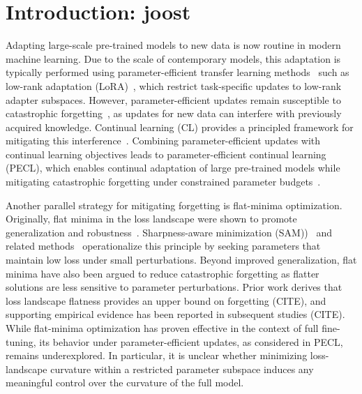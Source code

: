 \documentclass{article}
\theoremstyle{plain}
\theoremstyle{definition}
\theoremstyle{remark}
\begin{document}
\section{Introduction: joost}
Adapting large-scale pre-trained models to new data is now routine in modern machine learning. Due to the scale of contemporary models, this adaptation is typically performed using parameter-efficient transfer learning methods~\cite{han2024parameter} such as low-rank adaptation (LoRA)~\cite{hu2022lora}, which restrict task-specific updates to low-rank adapter subspaces. However, parameter-efficient updates remain susceptible to catastrophic forgetting~\cite{mccloskey1989catastrophic}, as updates for new data can interfere with previously acquired knowledge. Continual learning (CL) provides a principled framework for mitigating this interference~\cite{doi:10.1073/pnas.1611835114,rebuffi2017icarl, de2021continual}. Combining parameter-efficient updates with continual learning objectives leads to parameter-efficient continual learning (PECL), which enables continual adaptation of large pre-trained models while mitigating catastrophic forgetting under constrained parameter budgets~\cite{dingParameterefficientFinetuningLargescale2023,He_2025_CVPR,NEURIPS2024_b0bc711f}.


Another parallel strategy for mitigating forgetting is flat-minima optimization. Originally, flat minima in the loss landscape were shown to promote generalization and robustness~\citep{FlatMinima1997,wu2017understandinggeneralizationdeeplearning,chaudhariEntropySGDBiasingGradient2019,NEURIPS2020_518a38cc,NEURIPS2021_995f5e03,JMLRAnEmpiricalInvestigatio,yangRevisitingFlatnessAwareOptimization2025}. Sharpness-aware minimization (SAM))~\cite{foretSharpnessAwareMinimizationEfficiently2021} and related methods~\citep{pmlr-v151-bisla22a,zhangGradientNormAware2023,NEURIPS2024_C-Flat} operationalize this principle by seeking parameters that maintain low loss under small perturbations. Beyond improved generalization, flat minima have also been argued to reduce catastrophic forgetting as flatter solutions are less sensitive to parameter perturbations. Prior work derives that loss landscape flatness provides an upper bound on forgetting (CITE), and supporting empirical evidence has been reported in subsequent studies (CITE). While flat-minima optimization has proven effective in the context of full fine-tuning, its behavior under parameter-efficient updates, as considered in PECL, remains underexplored. In particular, it is unclear whether minimizing loss-landscape curvature within a restricted parameter subspace induces any meaningful control over the curvature of the full model.
\end{document}
